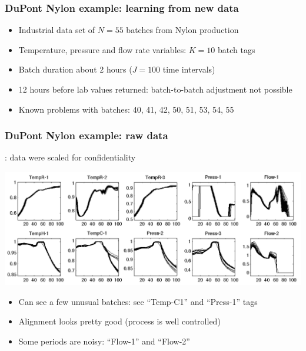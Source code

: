 \documentclass[handout, 12pt]{beamer}
\begin{document}
\begin{frame}\frametitle{DuPont Nylon example: learning from new data}

	\begin{itemize}
		\item	Industrial data set of \( N = 55 \) batches from Nylon production
		
		\item	Temperature, pressure and flow rate variables: \( K = 10\)  batch tags
		
		\item	Batch duration about 2 hours (\( J=100 \) time intervals)
		
		\item	12 hours before lab values returned: batch-to-batch adjustment not possible
		
		\item	Known problems with batches: 40, 41, 42, 50, 51, 53, 54, 55
	\end{itemize}
	
	
\end{frame}

\begin{frame}\frametitle{DuPont Nylon example: raw data}
	{\color{myGreen}{Note}}: data were scaled for confidentiality
	\begin{center}
		\includegraphics[width=\textwidth]{images/dupont/dupont-raw-data-trajectories.png}
	\end{center}
	
	\vspace{1cm}
	\begin{itemize}
		\item	Can see a few unusual batches: see ``Temp-C1'' and ``Press-1'' tags
		
		\item	Alignment looks pretty good (process is well controlled)
		
		\item	Some periods are noisy: ``Flow-1'' and ``Flow-2''
	\end{itemize}
\end{frame}
\end{document}
